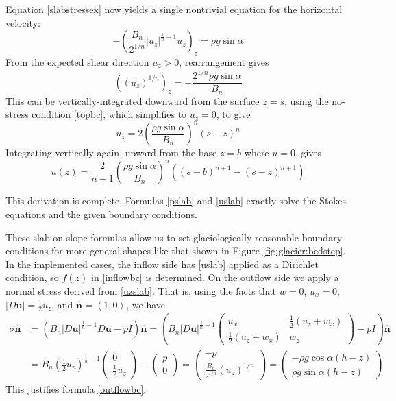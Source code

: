 \documentclass[letterpaper,final,12pt,reqno]{amsart}
\newcommand{\hbn}{\hat{\mathbf{n}}}
\newcommand{\bu}{\mathbf{u}}
\begin{document}
Equation \eqref{slabstressex} now yields a single nontrivial equation for the horizontal velocity:
\begin{equation}
- \left(\frac{B_n}{2^{1/n}} |u_z|^{\frac{1}{n}-1} u_z\right)_z = \rho g\sin\alpha
\end{equation}
From the expected shear direction $u_z>0$, rearrangement gives
\begin{equation}
\left((u_z)^{1/n} \right)_z = - \frac{2^{1/n} \rho g\sin\alpha}{B_n}
\end{equation}
This can be vertically-integrated downward from the surface $z=s$, using the no-stress condition \eqref{topbc}, which simplifies to $u_z=0$, to give
\begin{equation}
u_z = 2 \left(\frac{\rho g\sin\alpha}{B_n}\right)^n (s-z)^n  \label{uzslab}
\end{equation}
Integrating vertically again, upward from the base $z=b$ where $u=0$, gives
\begin{equation}
u(z) = \frac{2}{n+1} \left(\frac{\rho g\sin\alpha}{B_n}\right)^n \left((s-b)^{n+1} - (s-z)^{n+1}\right)  \label{uslab}
\end{equation}

This derivation is complete.  Formulas \eqref{pslab} and \eqref{uslab} exactly solve the Stokes equations and the given boundary conditions.

These slab-on-slope formulas allow us to set glaciologically-reasonable boundary conditions for more general shapes like that shown in Figure \ref{fig:glacier:bedstep}.  In the implemented cases, the inflow side has \eqref{uslab} applied as a Dirichlet condition, so $f(z)$ in \eqref{inflowbc} is determined.  On the outflow side we apply a normal stress derived from \eqref{uzslab}.  That is, using the facts that $w=0$, $u_x=0$, $|D\bu| = \frac{1}{2} u_z$, and $\hbn=\left<1,0\right>$, we have
\begin{align*}
\sigma \hbn &= \left(B_n |D\bu|^{\frac{1}{n}-1} D\bu - pI\right)\hbn = \left(B_n |D\bu|^{\frac{1}{n}-1} \begin{pmatrix} u_x & \frac{1}{2}(u_z+w_x) \\ \frac{1}{2}(u_z+w_x) & w_z \end{pmatrix} - pI\right)\hbn \\
    &= B_n \left(\frac{1}{2} u_z\right)^{\frac{1}{n}-1} \begin{pmatrix} 0 \\ \frac{1}{2} u_z \end{pmatrix} - \begin{pmatrix} p \\ 0 \end{pmatrix} = \begin{pmatrix} - p \\ \frac{B_n}{2^{1/n}} (u_z)^{1/n} \end{pmatrix} = \begin{pmatrix} - \rho g\cos\alpha (h-z) \\ \rho g\sin\alpha (h-z) \end{pmatrix}
\end{align*}
This justifies formula \eqref{outflowbc}.
\end{document}
